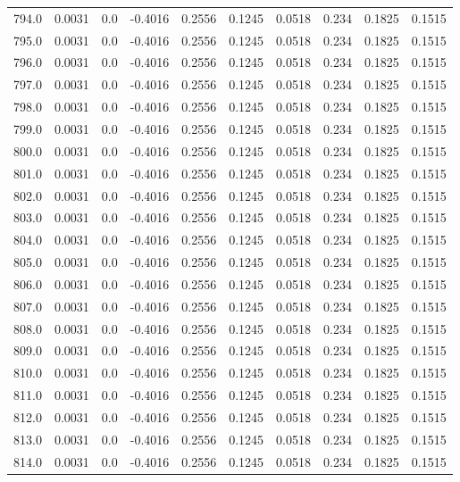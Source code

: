 \begin{longtable}{lrrrrrrrrr}
794.0 & 0.0031 & 0.0 & -0.4016 & 0.2556 & 0.1245 & 0.0518 & 0.234 & 0.1825 & 0.1515 \\
795.0 & 0.0031 & 0.0 & -0.4016 & 0.2556 & 0.1245 & 0.0518 & 0.234 & 0.1825 & 0.1515 \\
796.0 & 0.0031 & 0.0 & -0.4016 & 0.2556 & 0.1245 & 0.0518 & 0.234 & 0.1825 & 0.1515 \\
797.0 & 0.0031 & 0.0 & -0.4016 & 0.2556 & 0.1245 & 0.0518 & 0.234 & 0.1825 & 0.1515 \\
798.0 & 0.0031 & 0.0 & -0.4016 & 0.2556 & 0.1245 & 0.0518 & 0.234 & 0.1825 & 0.1515 \\
799.0 & 0.0031 & 0.0 & -0.4016 & 0.2556 & 0.1245 & 0.0518 & 0.234 & 0.1825 & 0.1515 \\
800.0 & 0.0031 & 0.0 & -0.4016 & 0.2556 & 0.1245 & 0.0518 & 0.234 & 0.1825 & 0.1515 \\
801.0 & 0.0031 & 0.0 & -0.4016 & 0.2556 & 0.1245 & 0.0518 & 0.234 & 0.1825 & 0.1515 \\
802.0 & 0.0031 & 0.0 & -0.4016 & 0.2556 & 0.1245 & 0.0518 & 0.234 & 0.1825 & 0.1515 \\
803.0 & 0.0031 & 0.0 & -0.4016 & 0.2556 & 0.1245 & 0.0518 & 0.234 & 0.1825 & 0.1515 \\
804.0 & 0.0031 & 0.0 & -0.4016 & 0.2556 & 0.1245 & 0.0518 & 0.234 & 0.1825 & 0.1515 \\
805.0 & 0.0031 & 0.0 & -0.4016 & 0.2556 & 0.1245 & 0.0518 & 0.234 & 0.1825 & 0.1515 \\
806.0 & 0.0031 & 0.0 & -0.4016 & 0.2556 & 0.1245 & 0.0518 & 0.234 & 0.1825 & 0.1515 \\
807.0 & 0.0031 & 0.0 & -0.4016 & 0.2556 & 0.1245 & 0.0518 & 0.234 & 0.1825 & 0.1515 \\
808.0 & 0.0031 & 0.0 & -0.4016 & 0.2556 & 0.1245 & 0.0518 & 0.234 & 0.1825 & 0.1515 \\
809.0 & 0.0031 & 0.0 & -0.4016 & 0.2556 & 0.1245 & 0.0518 & 0.234 & 0.1825 & 0.1515 \\
810.0 & 0.0031 & 0.0 & -0.4016 & 0.2556 & 0.1245 & 0.0518 & 0.234 & 0.1825 & 0.1515 \\
811.0 & 0.0031 & 0.0 & -0.4016 & 0.2556 & 0.1245 & 0.0518 & 0.234 & 0.1825 & 0.1515 \\
812.0 & 0.0031 & 0.0 & -0.4016 & 0.2556 & 0.1245 & 0.0518 & 0.234 & 0.1825 & 0.1515 \\
813.0 & 0.0031 & 0.0 & -0.4016 & 0.2556 & 0.1245 & 0.0518 & 0.234 & 0.1825 & 0.1515 \\
814.0 & 0.0031 & 0.0 & -0.4016 & 0.2556 & 0.1245 & 0.0518 & 0.234 & 0.1825 & 0.1515 \\

\end{longtable}
